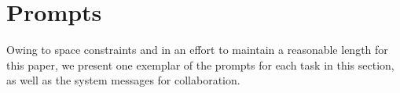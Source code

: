 \section{Prompts}
\label{appendix:prompts}

Owing to space constraints and in an effort to maintain a reasonable length for this paper, 
we present one exemplar of the prompts for each task in this section,
as well as the system messages for collaboration.















